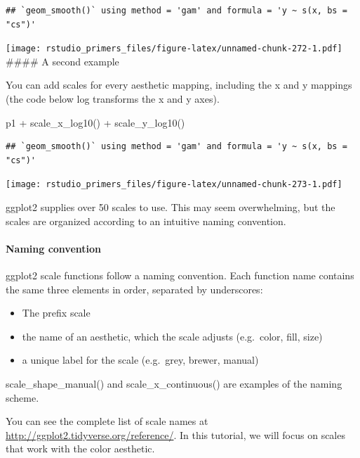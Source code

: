 \documentclass[
]{article}
\newenvironment{Shaded}{\begin{snugshade}}{\end{snugshade}}
\newcommand{\FunctionTok}[1]{\textcolor[rgb]{0.00,0.00,0.00}{#1}}
\newcommand{\NormalTok}[1]{#1}
\newcommand{\SpecialCharTok}[1]{\textcolor[rgb]{0.00,0.00,0.00}{#1}}
\providecommand{\tightlist}{%
  \setlength{\itemsep}{0pt}\setlength{\parskip}{0pt}}
\begin{document}
\begin{verbatim}
## `geom_smooth()` using method = 'gam' and formula = 'y ~ s(x, bs = "cs")'
\end{verbatim}

\texttt{[image: rstudio\_primers\_files/figure-latex/unnamed-chunk-272-1.pdf]}
\#\#\#\# A second example

You can add scales for every aesthetic mapping, including the x and y
mappings (the code below log transforms the x and y axes).

\begin{Shaded}
\begin{Highlighting}[]
\NormalTok{p1 }\SpecialCharTok{+}
  \FunctionTok{scale\_x\_log10}\NormalTok{() }\SpecialCharTok{+} 
  \FunctionTok{scale\_y\_log10}\NormalTok{()}
\end{Highlighting}
\end{Shaded}

\begin{verbatim}
## `geom_smooth()` using method = 'gam' and formula = 'y ~ s(x, bs = "cs")'
\end{verbatim}

\texttt{[image: rstudio\_primers\_files/figure-latex/unnamed-chunk-273-1.pdf]}

ggplot2 supplies over 50 scales to use. This may seem overwhelming, but
the scales are organized according to an intuitive naming convention.

\hypertarget{naming-convention}{%
\paragraph{Naming convention}\label{naming-convention}}

ggplot2 scale functions follow a naming convention. Each function name
contains the same three elements in order, separated by underscores:

\begin{itemize}
\tightlist
\item
  The prefix scale
\item
  the name of an aesthetic, which the scale adjusts (e.g.~color, fill,
  size)
\item
  a unique label for the scale (e.g.~grey, brewer, manual)
\end{itemize}

scale\_shape\_manual() and scale\_x\_continuous() are examples of the
naming scheme.

You can see the complete list of scale names at
\url{http://ggplot2.tidyverse.org/reference/}. In this tutorial, we will
focus on scales that work with the color aesthetic.
\end{document}
